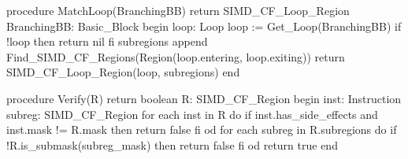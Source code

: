 \begin{ListingEnv}[!h]
    \captiondelim{ } 
    \begin{Verb}
procedure MatchLoop(BranchingBB) return SIMD_CF_Loop_Region
  BranchingBB: Basic_Block
begin
  loop: Loop
  loop := Get_Loop(BranchingBB)
  if !loop then
    return nil
  fi
  subregions append Find_SIMD_CF_Regions(Region(loop.entering, loop.exiting))
  return SIMD_CF_Loop_Region(loop, subregions)
end

procedure Verify(R) return boolean
  R: SIMD_CF_Region
begin
  inst: Instruction
  subreg: SIMD_CF_Region
  for each inst in R do
    if inst.has_side_effects and inst.mask != R.mask then
      return false     
    fi
  od
  for each subreg in R.subregions do
    if !R.is_submask(subreg_mask) then
      return false
    fi
  od
  return true
end
    \end{Verb}
\end{ListingEnv}
